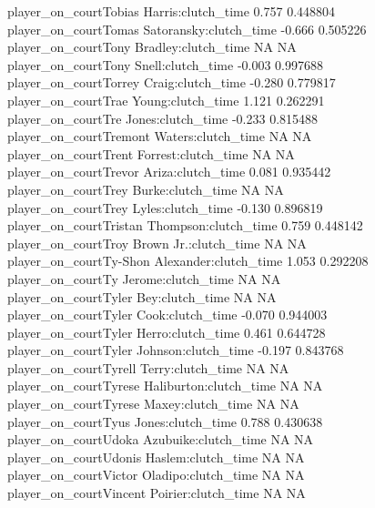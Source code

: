 \documentclass[
  landscape]{article}
\begin{document}
player\_on\_courtTobias Harris:clutch\_time 0.757 0.448804\\
player\_on\_courtTomas Satoransky:clutch\_time -0.666 0.505226\\
player\_on\_courtTony Bradley:clutch\_time NA NA\\
player\_on\_courtTony Snell:clutch\_time -0.003 0.997688\\
player\_on\_courtTorrey Craig:clutch\_time -0.280 0.779817\\
player\_on\_courtTrae Young:clutch\_time 1.121 0.262291\\
player\_on\_courtTre Jones:clutch\_time -0.233 0.815488\\
player\_on\_courtTremont Waters:clutch\_time NA NA\\
player\_on\_courtTrent Forrest:clutch\_time NA NA\\
player\_on\_courtTrevor Ariza:clutch\_time 0.081 0.935442\\
player\_on\_courtTrey Burke:clutch\_time NA NA\\
player\_on\_courtTrey Lyles:clutch\_time -0.130 0.896819\\
player\_on\_courtTristan Thompson:clutch\_time 0.759 0.448142\\
player\_on\_courtTroy Brown Jr.:clutch\_time NA NA\\
player\_on\_courtTy-Shon Alexander:clutch\_time 1.053 0.292208\\
player\_on\_courtTy Jerome:clutch\_time NA NA\\
player\_on\_courtTyler Bey:clutch\_time NA NA\\
player\_on\_courtTyler Cook:clutch\_time -0.070 0.944003\\
player\_on\_courtTyler Herro:clutch\_time 0.461 0.644728\\
player\_on\_courtTyler Johnson:clutch\_time -0.197 0.843768\\
player\_on\_courtTyrell Terry:clutch\_time NA NA\\
player\_on\_courtTyrese Haliburton:clutch\_time NA NA\\
player\_on\_courtTyrese Maxey:clutch\_time NA NA\\
player\_on\_courtTyus Jones:clutch\_time 0.788 0.430638\\
player\_on\_courtUdoka Azubuike:clutch\_time NA NA\\
player\_on\_courtUdonis Haslem:clutch\_time NA NA\\
player\_on\_courtVictor Oladipo:clutch\_time NA NA\\
player\_on\_courtVincent Poirier:clutch\_time NA NA\\
\end{document}
